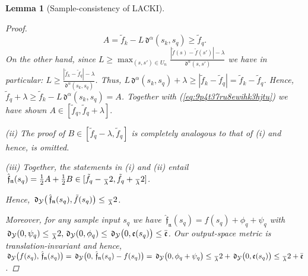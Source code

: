 \documentclass{article} %
\newtheorem{lem}[thm]{Lemma}
\theoremstyle{definition}
\theoremstyle{remark}
\newcommand{\abs}[1]{\left\vert#1\right\vert}
\newcommand{\outspace}{\ensuremath{ \mathcal Y}}
\newcommand{\metric}{\, \mathfrak{d}} %
\newcommand{\Metrico}[2]{\metric_\outspace\bigl(#1,#2\bigr) }
\newcommand{\predfn}{\, \mathfrak{  \hat f_n}} %
\newcommand{\hexp}{{ \alpha }}%
\newcommand{\hestthresh}{\ensuremath{ \lambda}}
\newcommand{\obserr}{\mathfrak e} %
\newcommand{\obserrbnd}{\bar{\mathfrak e}}
\begin{document}
\begin{lem}[Sample-consistency of LACKI]
\begin{proof}
\begin{equation} 
A=\tilde f_k - L \metric^\hexp(s_k,s_q) \geq \tilde f_q. \label{eq:9p4t37ru8ewihk3hjtu}
\end{equation} 
On the other hand, since $L  \geq  \max_{(s,s') \in U_n} \frac{\abs{\tilde f(s)-\tilde f(s')} - \hestthresh}{\metric^\hexp(s,s')}$  we have in particular: $L  \geq  \frac{ \abs{\tilde f_k- \tilde f_q}-\hestthresh }{\metric^\hexp(s_k,s_q)}$. Thus,  
 $L \metric^\hexp(s_k,s_q) + \hestthresh \geq \abs{\tilde f_k-\tilde f_q} = \tilde f_k - \tilde f_q$. Hence, $\tilde f_q + \hestthresh \geq \tilde f_k - L \metric^\hexp(s_k,s_q) = A$. 
 Together with (\ref{eq:9p4t37ru8ewihk3hjtu}) we have shown $A \in [\tilde f_q , \tilde f_q +\hestthresh].$
% 

(ii) The proof of \underline{$B \in [ \tilde f_q - \hestthresh, \tilde f_q]$} is completely analogous to that of (i) and hence, is omitted.

(iii) Together, the statements in (i) and (ii)  entail  $\predfn(s_q) = \frac 1 2 A + \frac 1 2 B  \in [\tilde f_q - \frac \hestthresh 2, \tilde f_q + \frac \hestthresh 2]$.

Hence, $\Metrico{\predfn(s_q)}{\tilde f(s_q)} \leq \frac \hestthresh 2$.

Moreover, for any sample input $s_q$ we have $\predfn(s_q) = f(s_q) + \phi_q + \psi_q$ with $\metric_{\outspace}(0,\psi_q) \leq \frac \hestthresh 2,  \metric_{\outspace}(0,\phi_q) \leq \Metrico 0 {\obserr(s_q)} \leq \obserrbnd$. 
Our output-space metric is translation-invariant and hence, $\Metrico{f(s_q)}{\predfn(s_q)} = \Metrico{0}{\predfn(s_q)- f(s_q)} = \Metrico{0}{  \phi_q + \psi_q} \leq \frac \hestthresh 2 +\Metrico 0 {\obserr(s_q)} \leq \frac \hestthresh 2 + \obserrbnd$.
\end{proof}
\end{lem}
\end{document}
